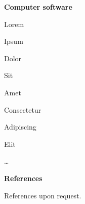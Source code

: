 \documentclass[a4paper,12pt,final]{memoir}
\newcommand{\Sep}{\vspace{1.5em}}
\newcommand{\SmallSep}{\vspace{0.5em}}
\newcommand{\CVSection}[1]
	{\Large\textbf{#1}\par
	\SmallSep\normalsize\normalfont}
\newcommand{\CVItem}[1]
	{\textbf{\color{Plum} #1}}
\begin{document}
\CVItem{Computer software}
\begin{multicols}{1}
\begin{compactitem}[\color{Plum}$\circ$]
	\item Lorem 
	\item Ipsum 
	\item Dolor 
	\item Sit 
	\item Amet
	\item Consectetur 
	\item Adipiscing 
	\item Elit
	\item \ldots
\end{compactitem}
\end{multicols}
\Sep 

\CVSection{References}
References upon request.

\end{document}
